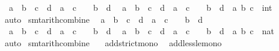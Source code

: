 \begin{isabellebody}
\ \ {\isachardoublequoteopen}a\ {\isacharless}{\kern0pt}\ b\ {\isasymLongrightarrow}\ c\ {\isasymle}\ d\ {\isasymLongrightarrow}\ a\ {\isacharplus}{\kern0pt}\ c\ {\isacharplus}{\kern0pt}\ {}\ {\isasymle}\ b\ {\isacharplus}{\kern0pt}\ d{\isachardoublequoteclose}\isanewline
\ \ {\isachardoublequoteopen}a\ {\isasymle}\ b\ {\isasymLongrightarrow}\ c\ {\isacharless}{\kern0pt}\ d\ {\isasymLongrightarrow}\ a\ {\isacharplus}{\kern0pt}\ c\ {\isacharplus}{\kern0pt}\ {}\ {\isasymle}\ b\ {\isacharplus}{\kern0pt}\ d{\isachardoublequoteclose}\ \ a\ b\ c\ {\isacharcolon}{\kern0pt}{\isacharcolon}{\kern0pt}\ int\isanewline
%
\isadelimproof
\ \ %
\endisadelimproof
%
\isatagproof
{}\isamarkupfalse%
\ auto%
\endisatagproof
{\isafoldproof}%
%
\isadelimproof
\isanewline
%
\endisadelimproof
\isanewline
{}\isamarkupfalse%
\ {\isacharbrackleft}{\kern0pt}smt{\isacharunderscore}{\kern0pt}arith{\isacharunderscore}{\kern0pt}combine{\isacharbrackright}{\kern0pt}{\isacharcolon}{\kern0pt}\isanewline
\ \ {\isachardoublequoteopen}a\ {\isacharless}{\kern0pt}\ b\ {\isasymLongrightarrow}\ c\ {\isacharless}{\kern0pt}\ d\ {\isasymLongrightarrow}\ a\ {\isacharplus}{\kern0pt}\ c\ {\isacharplus}{\kern0pt}\ {}\ {\isasymle}\ b\ {\isacharplus}{\kern0pt}\ d{\isachardoublequoteclose}\isanewline
\ \ {\isachardoublequoteopen}a\ {\isacharless}{\kern0pt}\ b\ {\isasymLongrightarrow}\ c\ {\isasymle}\ d\ {\isasymLongrightarrow}\ a\ {\isacharplus}{\kern0pt}\ c\ {\isacharplus}{\kern0pt}\ {}\ {\isasymle}\ b\ {\isacharplus}{\kern0pt}\ d{\isachardoublequoteclose}\isanewline
\ \ {\isachardoublequoteopen}a\ {\isasymle}\ b\ {\isasymLongrightarrow}\ c\ {\isacharless}{\kern0pt}\ d\ {\isasymLongrightarrow}\ a\ {\isacharplus}{\kern0pt}\ c\ {\isacharplus}{\kern0pt}\ {}\ {\isasymle}\ b\ {\isacharplus}{\kern0pt}\ d{\isachardoublequoteclose}\ \ a\ b\ c\ {\isacharcolon}{\kern0pt}{\isacharcolon}{\kern0pt}\ nat\isanewline
%
\isadelimproof
\ \ %
\endisadelimproof
%
\isatagproof
{}\isamarkupfalse%
\ auto%
\endisatagproof
{\isafoldproof}%
%
\isadelimproof
\isanewline
%
\endisadelimproof
\isanewline
{}\isamarkupfalse%
\ {\isacharbrackleft}{\kern0pt}smt{\isacharunderscore}{\kern0pt}arith{\isacharunderscore}{\kern0pt}combine{\isacharbrackright}{\kern0pt}\ {\isacharequal}{\kern0pt}\isanewline
\ \ add{\isacharunderscore}{\kern0pt}strict{\isacharunderscore}{\kern0pt}mono\isanewline
\ \ add{\isacharunderscore}{\kern0pt}less{\isacharunderscore}{\kern0pt}le{\isacharunderscore}{\kern0pt}mono\isanewline

\end{isabellebody}
